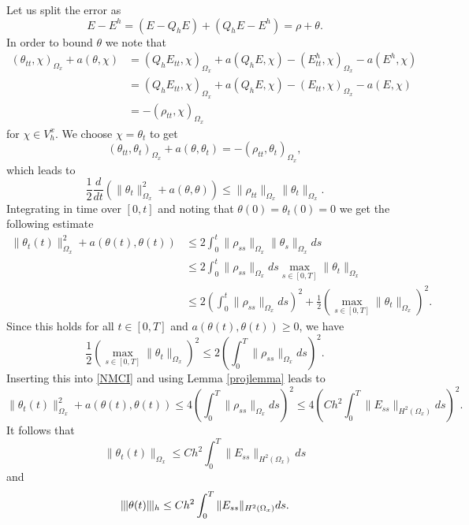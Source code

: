 \documentclass[reqno,a4paper]{amsart}
\theoremstyle{remark}
\numberwithin{equation}{section}
\newcommand{\norm}[1]{\|#1\|}
\newcommand{\Tnorm}[1]{|\mkern-1mu|\mkern-1mu|#1|\mkern-1mu|\mkern-1mu|}
\begin{document}
Let us split the error as
\[
E - E^h = (E - Q_h E) + (Q_h E - E^h) = \rho + \theta.
\]
In order to bound $ \theta $ we note that
\[
\begin{aligned}
(\theta_{tt}, \chi)_{\Omega_x} + a(\theta, \chi) &= 
(Q_h E_{tt}, \chi)_{\Omega_x} + a(Q_h E, \chi)
 - (E^h_{tt}, \chi)_{\Omega_x} - a(E^h, \chi) \\
&= (Q_h E_{tt}, \chi)_{\Omega_x} + a(Q_h E, \chi) 
- (E_{tt}, \chi)_{\Omega_x} - a(E, \chi) \\
&= - (\rho_{tt}, \chi)_{\Omega_x}
\end{aligned}
\]
for $ \chi \in V^x_h $. We choose $ \chi = \theta_t $ to get
\[
(\theta_{tt}, \theta_t )_{\Omega_x} + a(\theta, \theta_t ) 
= - (\rho_{tt}, \theta_t)_{\Omega_x},
\]
which leads to
\[
\frac{1}{2} \frac{d}{dt} \left( \norm{\theta_t }^2_{\Omega_x} 
+ a(\theta, \theta)\right) \leq \norm{\rho_{tt}}_{\Omega_x} \norm{\theta_t}_{\Omega_x}.
\]
Integrating in time over $ [0, t] $ and noting that $ \theta (0) 
= \theta_t (0) = 0 $ we get the following estimate
\begin{equation} \label{NMCI}
\begin{aligned}
\norm{\theta_t (t)}^2_{\Omega_x} + a(\theta (t), \theta (t)) & 
\leq 2 \int^t_0 \norm{\rho_{ss}}_{\Omega_x} \norm{\theta_s}_{\Omega_x} ds \\
&\leq 2 \int^t_0 \norm{\rho_{ss}}_{\Omega_x} ds \max_{s \in [0, T]} \norm{\theta_t}_{\Omega_x} \\
&\leq 2 \left( \int^t_0 \norm{\rho_{ss}}_{\Omega_x} ds \right)^2 
+ \frac{1}{2} \left( \max_{s \in [0, T]} \norm{\theta_t}_{\Omega_x} \right)^2.
\end{aligned}
\end{equation}
Since this holds for all $ t \in [0, T] $ and 
$ a(\theta (t), \theta (t)) \geq 0 $, we have
\[
\frac{1}{2} \left( \max_{s \in [0, T]} \norm{\theta_t}_{\Omega_x}
 \right)^2 \leq 2 \left( \int^T_0 \norm{\rho_{ss}}_{\Omega_x} ds \right)^2.
\]
Inserting this into \eqref{NMCI} and using Lemma \ref{projlemma} leads to
\[
\norm{\theta_t (t)}^2_{\Omega_x} + a(\theta (t), \theta (t)) \leq 4 \left( \int^T_0 \norm{\rho_{ss}}_{\Omega_x} ds \right)^2
\leq 4 \left( C h^2 \int^T_0 \norm{E_{ss}}_{H^2(\Omega_x)} ds \right)^2.
\]
It follows that
\begin{equation} \label{NMCII}
\norm{\theta_t (t)}_{\Omega_x} \leq C h^2 \int^T_0 \norm{E_{ss}}_{H^2(\Omega_x)} ds
\end{equation}
and
\begin{equation} \label{NMCIII}
\Tnorm{\theta (t)}_h \leq C h^2 \int^T_0 \norm{E_{ss}}_{H^2(\Omega_x)} ds.
\end{equation}
\end{document}
